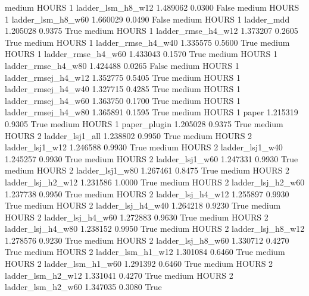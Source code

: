     medium    HOURS                 1   ladder_lsm_h8_w12   1.489062      0.0300   False
    medium    HOURS                 1   ladder_lsm_h8_w60   1.660029      0.0490   False
    medium    HOURS                 1          ladder_mdd   1.205028      0.9375    True
    medium    HOURS                 1  ladder_rmse_h4_w12   1.373207      0.2605    True
    medium    HOURS                 1  ladder_rmse_h4_w40   1.335575      0.5600    True
    medium    HOURS                 1  ladder_rmse_h4_w60   1.433043      0.1570    True
    medium    HOURS                 1  ladder_rmse_h4_w80   1.424488      0.0265   False
    medium    HOURS                 1 ladder_rmsej_h4_w12   1.352775      0.5405    True
    medium    HOURS                 1 ladder_rmsej_h4_w40   1.327715      0.4285    True
    medium    HOURS                 1 ladder_rmsej_h4_w60   1.363750      0.1700    True
    medium    HOURS                 1 ladder_rmsej_h4_w80   1.365891      0.1595    True
    medium    HOURS                 1               paper   1.215319      0.9305    True
    medium    HOURS                 1        paper_plugin   1.205028      0.9375    True
    medium    HOURS                 2     ladder_lsj1_all   1.238802      0.9950    True
    medium    HOURS                 2     ladder_lsj1_w12   1.246588      0.9930    True
    medium    HOURS                 2     ladder_lsj1_w40   1.245257      0.9930    True
    medium    HOURS                 2     ladder_lsj1_w60   1.247331      0.9930    True
    medium    HOURS                 2     ladder_lsj1_w80   1.267461      0.8475    True
    medium    HOURS                 2   ladder_lsj_h2_w12   1.231586      1.0000    True
    medium    HOURS                 2   ladder_lsj_h2_w60   1.237738      0.9950    True
    medium    HOURS                 2   ladder_lsj_h4_w12   1.255897      0.9930    True
    medium    HOURS                 2   ladder_lsj_h4_w40   1.264218      0.9230    True
    medium    HOURS                 2   ladder_lsj_h4_w60   1.272883      0.9630    True
    medium    HOURS                 2   ladder_lsj_h4_w80   1.238152      0.9950    True
    medium    HOURS                 2   ladder_lsj_h8_w12   1.278576      0.9230    True
    medium    HOURS                 2   ladder_lsj_h8_w60   1.330712      0.4270    True
    medium    HOURS                 2   ladder_lsm_h1_w12   1.301084      0.6460    True
    medium    HOURS                 2   ladder_lsm_h1_w60   1.291392      0.6460    True
    medium    HOURS                 2   ladder_lsm_h2_w12   1.331041      0.4270    True
    medium    HOURS                 2   ladder_lsm_h2_w60   1.347035      0.3080    True
